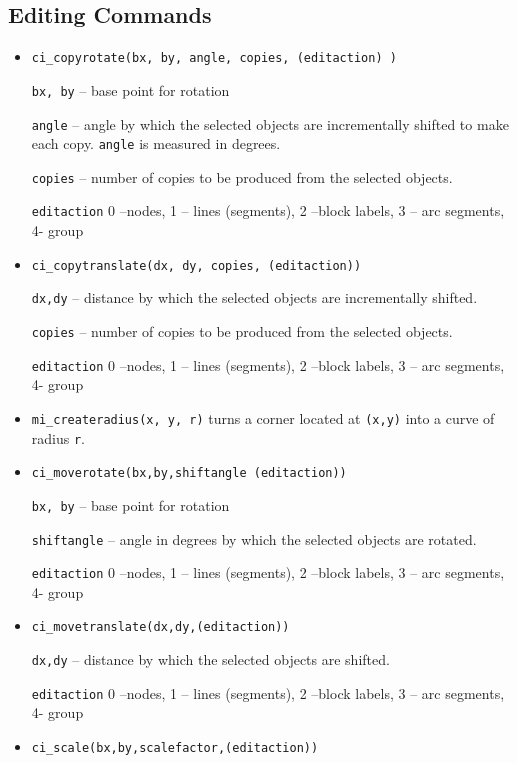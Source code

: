 \subsection{Editing Commands}
\begin{itemize}

\item \texttt{ci\_copyrotate(bx, by, angle, copies, (editaction) )}

\texttt{bx, by} -- base point for rotation

\texttt{angle} -- angle by which the selected objects are incrementally
shifted to make each copy. \texttt{angle} is measured in degrees.

\texttt{copies} -- number of copies to be produced from the selected
objects.

\texttt{editaction} 0 --nodes, 1 -- lines (segments), 2 --block labels, 3 --
arc segments, 4- group

\item \texttt{ci\_copytranslate(dx, dy, copies, (editaction))}

\texttt{dx,dy} -- distance by which the selected objects are incrementally
shifted.

\texttt{copies} -- number of copies to be produced from the selected
objects.

\texttt{editaction} 0 --nodes, 1 -- lines (segments), 2 --block labels, 3 --
arc segments, 4- group

\item{\tt mi\_createradius(x, y, r)} turns a corner located at {\tt (x,y)} into a curve of radius {\tt r}.

\item \texttt{ci\_moverotate(bx,by,shiftangle (editaction))}

\texttt{bx, by} -- base point for rotation

\texttt{shiftangle} -- angle in degrees by which the selected objects are
rotated.

\texttt{editaction} 0 --nodes, 1 -- lines (segments), 2 --block labels, 3 --
arc segments, 4- group

\item \texttt{ci\_movetranslate(dx,dy,(editaction))}

\texttt{dx,dy} -- distance by which the selected objects are shifted.

\texttt{editaction} 0 --nodes, 1 -- lines (segments), 2 --block labels, 3 --
arc segments, 4- group

\item \texttt{ci\_scale(bx,by,scalefactor,(editaction))}


\end{itemize}
